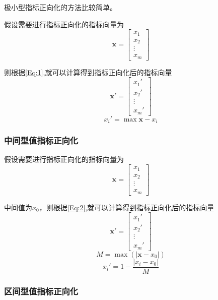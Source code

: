 \documentclass[withoutpreface]{cumcmthesis}
\begin{document}
    极小型指标正向化的方法比较简单。
    
    假设需要进行指标正向化的指标向量为$$\mathbf{x}=\begin{bmatrix}
        x_1  \\ x_2 \\ \vdots \\ x_m
    \end{bmatrix}$$
    
    则根据\cref{Eq:1},就可以计算得到指标正向化后的指标向量
    $$\mathbf{x}'=\begin{bmatrix}
        x_1'  \\ x_2' \\ \vdots \\ x_m'
    \end{bmatrix}$$
    \begin{equation}\label{Eq:1}
        x_i' = \max\mathbf{x}-x_i
    \end{equation}

    \subsubsection{中间型值指标正向化}
    
    假设需要进行指标正向化的指标向量为$$\mathbf{x}=\begin{bmatrix}
        x_1 \\ x_2 \\ \vdots \\ x_m
    \end{bmatrix}$$ 
    
    中间值为$x_0$，则根据\cref{Eq:2},就可以计算得到指标正向化后的指标向量
    $$\mathbf{x}'=\begin{bmatrix}
        x_1' \\ x_2' \\ \vdots \\ x_m'
    \end{bmatrix}$$
    \begin{equation*}
        M=\max (|\mathbf{x}-x_0|)
    \end{equation*}
    \begin{equation}\label{Eq:2}
        x_i' = 1 - \frac{|x_i-x_0|}{M}
    \end{equation}

    \subsubsection{区间型值指标正向化}
    
\end{document}
